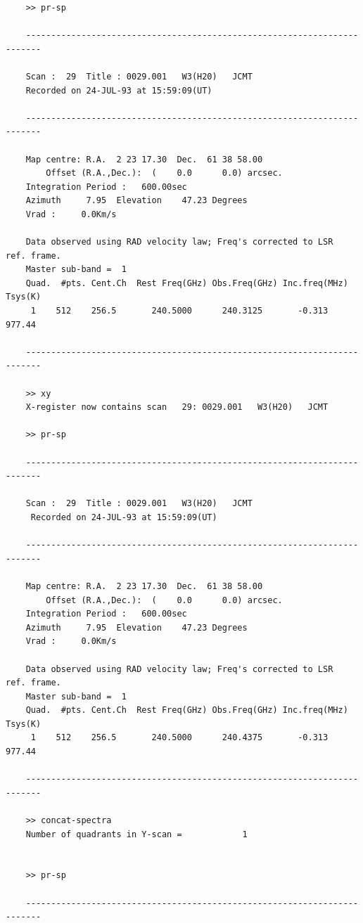 \documentclass[11pt,twoside]{report}
\begin{document}
\begin{verbatim}
    >> pr-sp

    -------------------------------------------------------------------------
   
    Scan :  29  Title : 0029.001   W3(H20)   JCMT 
    Recorded on 24-JUL-93 at 15:59:09(UT)

    -------------------------------------------------------------------------

    Map centre: R.A.  2 23 17.30  Dec.  61 38 58.00
        Offset (R.A.,Dec.):  (    0.0      0.0) arcsec.
    Integration Period :   600.00sec
    Azimuth     7.95  Elevation    47.23 Degrees
    Vrad :     0.0Km/s

    Data observed using RAD velocity law; Freq's corrected to LSR  ref. frame.
    Master sub-band =  1
    Quad.  #pts. Cent.Ch  Rest Freq(GHz) Obs.Freq(GHz) Inc.freq(MHz) Tsys(K)
     1    512    256.5       240.5000      240.3125       -0.313    977.44    

    -------------------------------------------------------------------------

    >> xy
    X-register now contains scan   29: 0029.001   W3(H20)   JCMT

    >> pr-sp

    -------------------------------------------------------------------------

    Scan :  29  Title : 0029.001   W3(H20)   JCMT 
     Recorded on 24-JUL-93 at 15:59:09(UT)

    -------------------------------------------------------------------------

    Map centre: R.A.  2 23 17.30  Dec.  61 38 58.00
        Offset (R.A.,Dec.):  (    0.0      0.0) arcsec.
    Integration Period :   600.00sec
    Azimuth     7.95  Elevation    47.23 Degrees
    Vrad :     0.0Km/s

    Data observed using RAD velocity law; Freq's corrected to LSR  ref. frame.
    Master sub-band =  1
    Quad.  #pts. Cent.Ch  Rest Freq(GHz) Obs.Freq(GHz) Inc.freq(MHz) Tsys(K)
     1    512    256.5       240.5000      240.4375       -0.313    977.44    

    -------------------------------------------------------------------------

    >> concat-spectra
    Number of quadrants in Y-scan =            1


    >> pr-sp

    -------------------------------------------------------------------------
   

\end{verbatim}
\end{document}
